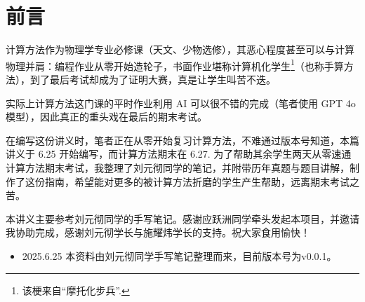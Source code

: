 \chapter*{前言}
计算方法作为物理学专业必修课（天文、少物选修），其恶心程度甚至可以与计算物理并肩：编程作业从零开始造轮子，书面作业堪称计算机化学生\footnote{该梗来自“摩托化步兵”.}（也称手算方法），到了最后考试却成为了证明大赛，真是让学生叫苦不迭。

实际上计算方法这门课的平时作业利用 AI 可以很不错的完成（笔者使用 GPT 4o 模型），因此真正的重头戏在最后的期末考试。

在编写这份讲义时，笔者正在从零开始复习计算方法，不难通过版本号知道，本篇讲义于 6.25 开始编写，而计算方法期末在 6.27. 为了帮助其余学生两天从零速通计算方法期末考试，我整理了刘元彻同学的笔记，并附带历年真题与题目讲解，制作了这份指南，希望能对更多的被计算方法折磨的学生产生帮助，远离期末考试之苦。

本讲义主要参考刘元彻同学的手写笔记。感谢应跃洲同学牵头发起本项目，并邀请我协助完成，感谢刘元彻学长与施耀炜学长的支持。祝大家食用愉快！


\begin{itemize}
    \item 2025.6.25 本资料由刘元彻同学手写笔记整理而来，目前版本号为v0.0.1。
\end{itemize}